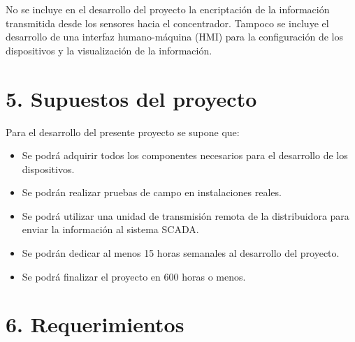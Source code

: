 \documentclass[
11pt, %
]{charter}
\begin{document}
No se incluye en el desarrollo del proyecto la encriptación de la información transmitida desde los sensores hacia el concentrador. Tampoco se incluye el desarrollo de una interfaz humano-máquina (HMI) para la configuración de los dispositivos y la visualización de la información.


\section{5. Supuestos del proyecto}
\label{sec:supuestos}

Para el desarrollo del presente proyecto se supone que:

\begin{itemize}
	\item Se podrá adquirir todos los componentes necesarios para el desarrollo de los dispositivos.
	\item Se podrán realizar pruebas de campo en instalaciones reales.
	\item Se podrá utilizar una unidad de transmisión remota de la distribuidora para enviar la información al sistema SCADA.
	\item Se podrán dedicar al menos 15 horas semanales al desarrollo del proyecto.
	\item Se podrá finalizar el proyecto en 600 horas o menos.
\end{itemize}

\section{6. Requerimientos}
\label{sec:requerimientos}
\end{document}

